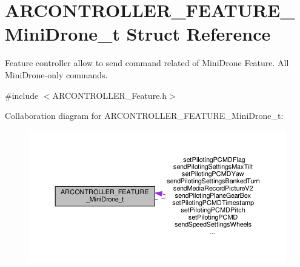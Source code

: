 \hypertarget{struct_a_r_c_o_n_t_r_o_l_l_e_r___f_e_a_t_u_r_e___mini_drone__t}{}\section{A\+R\+C\+O\+N\+T\+R\+O\+L\+L\+E\+R\+\_\+\+F\+E\+A\+T\+U\+R\+E\+\_\+\+Mini\+Drone\+\_\+t Struct Reference}
\label{struct_a_r_c_o_n_t_r_o_l_l_e_r___f_e_a_t_u_r_e___mini_drone__t}


Feature controller allow to send command related of Mini\+Drone Feature. All Mini\+Drone-\/only commands.  




{\ttfamily \#include $<$A\+R\+C\+O\+N\+T\+R\+O\+L\+L\+E\+R\+\_\+\+Feature.\+h$>$}



Collaboration diagram for A\+R\+C\+O\+N\+T\+R\+O\+L\+L\+E\+R\+\_\+\+F\+E\+A\+T\+U\+R\+E\+\_\+\+Mini\+Drone\+\_\+t\+:
\nopagebreak
\begin{figure}[H]
\begin{center}
\leavevmode
\includegraphics[width=350pt]{struct_a_r_c_o_n_t_r_o_l_l_e_r___f_e_a_t_u_r_e___mini_drone__t__coll__graph}
\end{center}
\end{figure}
